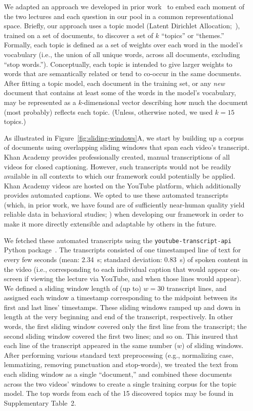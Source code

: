 \documentclass[10pt]{article}
\newcommand{\topics}{2}
\begin{document}
We adapted an approach we developed in prior work~\citep{HeusEtal21} to embed
each moment of the two lectures and each question in our pool in a common
representational space. Briefly, our approach uses a topic model (Latent
Dirichlet Allocation;~\citealp{BleiEtal03}), trained on a set of documents, to
discover a set of $k$ ``topics'' or ``themes.'' Formally, each topic is defined
as a set of weights over each word in the model's vocabulary (i.e., the union
of all unique words, across all documents, excluding ``stop words.'').
Conceptually, each topic is intended to give larger weights to words that are
semantically related or tend to co-occur in the same documents. After
fitting a topic model, each document in the training set, or any \textit{new}
document that contains at least some of the words in the model's vocabulary,
may be represented as a $k$-dimensional vector describing how much the document
(most probably) reflects each topic. (Unless, otherwise noted, we used $k = 15$
topics.)

As illustrated in Figure~\ref{fig:sliding-windows}A, we start by building up a
corpus of documents using overlapping sliding windows that span each video's
transcript. Khan Academy provides professionally created, manual transcriptions
of all videos for closed captioning. However, such transcripts would not be
readily available in all contexts to which our framework could potentially be
applied. Khan Academy videos are hosted on the YouTube platform, which
additionally provides automated captions. We opted to use these automated
transcripts (which, in prior work, we have found are of sufficiently near-human
quality yield reliable data in behavioral studies; \citealp{ZimaEtal18}) when
developing our framework in order to make it more directly extensible and
adaptable by others in the future.

We fetched these automated transcripts using the
\texttt{youtube-transcript-api} Python package~\citep{Depo19}. The transcripts
consisted of one timestamped line of text for every few seconds (mean: 2.34~s;
standard deviation: 0.83~s) of spoken content in the video (i.e., corresponding
to each individual caption that would appear on-screen if viewing the lecture
via YouTube, and when those lines would appear). We defined a sliding window
length of (up to) $w = 30$ transcript lines, and assigned each window a
timestamp corresponding to the midpoint between its first and last lines'
timestamps. These sliding windows ramped up and down in length at the very
beginning and end of the transcript, respectively. In other words, the first
sliding window covered only the first line from the transcript; the second
sliding window covered the first two lines; and so on. This insured that each
line of the transcript appeared in the same number ($w$) of sliding windows.
After performing various standard text preprocessing (e.g., normalizing case,
lemmatizing, removing punctuation and stop-words), we treated the text from
each sliding window as a single ``document,'' and combined these documents
across the two videos' windows to create a single training corpus for the topic
model. The top words from each of the 15 discovered topics may be found in
Supplementary Table~\topics.
\end{document}
